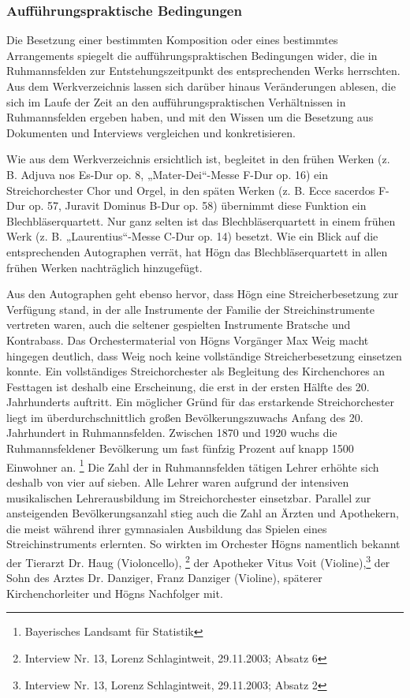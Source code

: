 \subsubsection{Aufführungspraktische Bedingungen}

Die Besetzung einer bestimmten
Komposition oder eines bestimmtes Arrangements spiegelt die
aufführungspraktischen Bedingungen wider, die in Ruhmannsfelden zur
Entstehungszeitpunkt des entsprechenden Werks herrschten. Aus dem
Werkverzeichnis lassen sich darüber hinaus Veränderungen ablesen, die
sich im Laufe der Zeit an den aufführungspraktischen Verhältnissen in
Ruhmannsfelden ergeben haben, und mit den Wissen um die Besetzung aus
Dokumenten und Interviews vergleichen und konkretisieren.

Wie aus dem Werkverzeichnis ersichtlich ist, begleitet in den frühen
Werken (z. B. Adjuva nos Es-Dur op. 8, „Mater-Dei“-Messe F-Dur op. 16)
ein Streichorchester Chor und Orgel, in den späten Werken (z. B. Ecce
sacerdos F-Dur op. 57, Juravit Dominus B-Dur op. 58) übernimmt diese
Funktion ein Blechbläserquartett. Nur ganz selten ist das
Blechbläserquartett in einem frühen Werk (z. B. „Laurentius“-Messe
C-Dur op. 14) besetzt. Wie ein Blick auf die entsprechenden Autographen
verrät, hat Högn das Blechbläserquartett in allen frühen Werken
nachträglich hinzugefügt.

Aus den Autographen geht ebenso hervor, dass Högn eine
Streicherbesetzung zur Verfügung stand, in der alle Instrumente der
Familie der Streichinstrumente vertreten waren, auch die seltener
gespielten Instrumente Bratsche und Kontrabass. Das Orchestermaterial
von Högns Vorgänger Max Weig macht hingegen deutlich, dass Weig noch
keine vollständige Streicherbesetzung einsetzen konnte. Ein
vollständiges Streichorchester als Begleitung des Kirchenchores an
Festtagen ist deshalb eine Erscheinung, die erst in der ersten Hälfte
des 20. Jahrhunderts auftritt. Ein möglicher Gründ für das erstarkende
Streichorchester liegt im überdurchschnittlich großen
Bevölkerungszuwachs Anfang des 20. Jahrhundert in Ruhmannsfelden.
Zwischen 1870 und 1920 wuchs die Ruhmannsfeldener Bevölkerung um fast
fünfzig Prozent auf knapp 1500 Einwohner an. \footnote{Bayerisches
Landsamt für Statistik} Die Zahl der in Ruhmannsfelden tätigen Lehrer
erhöhte sich deshalb von vier auf sieben. Alle Lehrer waren aufgrund
der intensiven musikalischen Lehrerausbildung im Streichorchester
einsetzbar. Parallel zur ansteigenden Bevölkerungsanzahl stieg auch die
Zahl an Ärzten und Apothekern, die meist während ihrer gymnasialen
Ausbildung das Spielen eines Streichinstruments erlernten. So wirkten
im Orchester Högns namentlich bekannt der Tierarzt Dr. Haug
(Violoncello), \footnote{Interview Nr. 13, Lorenz Schlagintweit,
29.11.2003; Absatz 6} der Apotheker Vitus Voit (Violine),\footnote{
Interview Nr. 13, Lorenz Schlagintweit, 29.11.2003; Absatz 2} der Sohn
des Arztes Dr. Danziger, Franz Danziger (Violine), späterer
Kirchenchorleiter und Högns Nachfolger mit.


